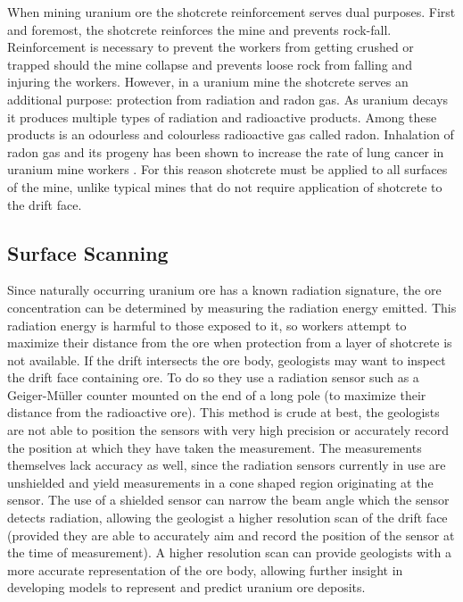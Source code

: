 When mining uranium ore the shotcrete reinforcement serves dual purposes. First and foremost, the shotcrete reinforces the mine and prevents rock-fall. Reinforcement is necessary to prevent the workers from getting crushed or trapped should the mine collapse and prevents loose rock from falling and injuring the workers. However, in a uranium mine the shotcrete serves an additional purpose: protection from radiation and radon gas. As uranium decays it produces multiple types of radiation and radioactive products. Among these products is an odourless and colourless radioactive gas called radon. Inhalation of radon gas and its progeny has been shown to increase the rate of lung cancer in uranium mine workers \cite{radon}. For this reason shotcrete must be applied to all surfaces of the mine, unlike typical mines that do not require application of shotcrete to the drift face.\\

\subsection{Surface Scanning}

Since naturally occurring uranium ore has a known radiation signature, the ore concentration can be determined by measuring the radiation energy emitted. This radiation energy is harmful to those exposed to it, so workers attempt to maximize their distance from the ore when protection from a layer of shotcrete is not available. If the drift intersects the ore body, geologists may want to inspect the drift face containing ore. To do so they use a radiation sensor such as a Geiger-M{\"u}ller counter mounted on the end of a long pole (to maximize their distance from the radioactive ore). This method is crude at best, the geologists are not able to position the sensors with very high precision or accurately record the position at which they have taken the measurement. The measurements themselves lack accuracy as well, since the radiation sensors currently in use are unshielded and yield measurements in a cone shaped region originating at the sensor. The use of a shielded sensor can narrow the beam angle which the sensor detects radiation, allowing the geologist a higher resolution scan of the drift face (provided they are able to accurately aim and record the position of the sensor at the time of measurement). A higher resolution scan can provide geologists with a more accurate representation of the ore body, allowing further insight in developing models to represent and predict uranium ore deposits.\\


